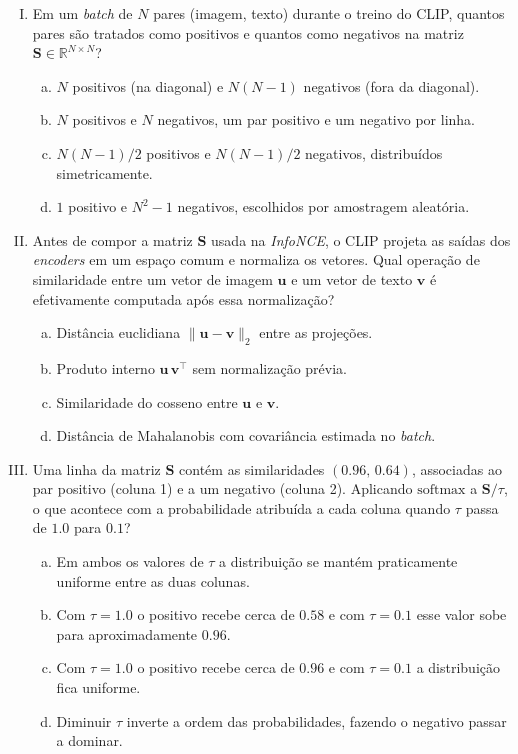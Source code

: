 \documentclass{dlproblemset}
\begin{document}
\begin{enumerate}[I)]
    \item Em um \textit{batch} de $N$ pares (imagem, texto) durante o treino do CLIP, quantos pares são tratados como positivos e quantos como negativos na matriz $\mathbf{S} \in \mathbb{R}^{N \times N}$?
    \begin{enumerate}[(a)]
        \item $N$ positivos (na diagonal) e $N(N-1)$ negativos (fora da diagonal).
        \item $N$ positivos e $N$ negativos, um par positivo e um negativo por linha.
        \item $N(N-1)/2$ positivos e $N(N-1)/2$ negativos, distribuídos simetricamente.
        \item $1$ positivo e $N^2 - 1$ negativos, escolhidos por amostragem aleatória.
    \end{enumerate}

    \item Antes de compor a matriz $\mathbf{S}$ usada na \textit{InfoNCE}, o CLIP projeta as saídas dos \textit{encoders} em um espaço comum e normaliza os vetores. Qual operação de similaridade entre um vetor de imagem $\mathbf{u}$ e um vetor de texto $\mathbf{v}$ é efetivamente computada após essa normalização?
    \begin{enumerate}[(a)]
        \item Distância euclidiana $\lVert \mathbf{u} - \mathbf{v} \rVert_2$ entre as projeções.
        \item Produto interno $\mathbf{u}\,\mathbf{v}^{\top}$ sem normalização prévia.
        \item Similaridade do cosseno entre $\mathbf{u}$ e $\mathbf{v}$.
        \item Distância de Mahalanobis com covariância estimada no \textit{batch}.
    \end{enumerate}

    \item Uma linha da matriz $\mathbf{S}$ contém as similaridades $(0.96,\, 0.64)$, associadas ao par positivo (coluna 1) e a um negativo (coluna 2). Aplicando $\mathrm{softmax}$ a $\mathbf{S}/\tau$, o que acontece com a probabilidade atribuída a cada coluna quando $\tau$ passa de $1.0$ para $0.1$?
    \begin{enumerate}[(a)]
        \item Em ambos os valores de $\tau$ a distribuição se mantém praticamente uniforme entre as duas colunas.
        \item Com $\tau = 1.0$ o positivo recebe cerca de $0.58$ e com $\tau = 0.1$ esse valor sobe para aproximadamente $0.96$.
        \item Com $\tau = 1.0$ o positivo recebe cerca de $0.96$ e com $\tau = 0.1$ a distribuição fica uniforme.
        \item Diminuir $\tau$ inverte a ordem das probabilidades, fazendo o negativo passar a dominar.
    \end{enumerate}


\end{enumerate}
\end{document}
